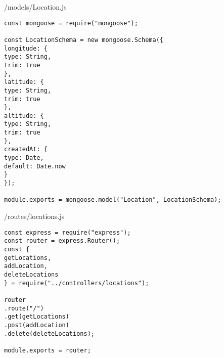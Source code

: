 /models/Location.js
\begin{lstlisting}
const mongoose = require("mongoose");

const LocationSchema = new mongoose.Schema({
longitude: {
type: String,
trim: true
},
latitude: {
type: String,
trim: true
},
altitude: {
type: String,
trim: true
},
createdAt: {
type: Date,
default: Date.now
}
});

module.exports = mongoose.model("Location", LocationSchema);
\end{lstlisting}
/routes/locations.js
\begin{lstlisting}
const express = require("express");
const router = express.Router();
const {
getLocations,
addLocation,
deleteLocations
} = require("../controllers/locations");

router
.route("/")
.get(getLocations)
.post(addLocation)
.delete(deleteLocations);

module.exports = router;
\end{lstlisting}